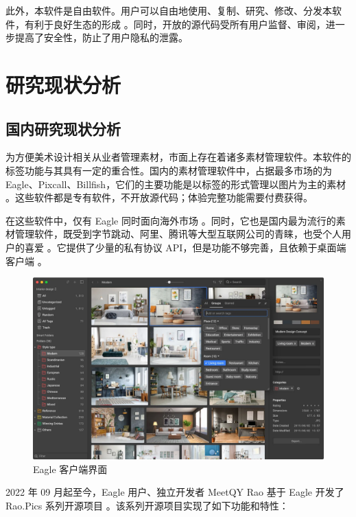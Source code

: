 此外，本软件是自由软件。用户可以自由地使用、复制、研究、修改、分发本软件，有利于良好生态的形成 \cite{free}。同时，开放的源代码受所有用户监督、审阅，进一步提高了安全性，防止了用户隐私的泄露。

\section{研究现状分析}

\subsection{国内研究现状分析}

为方便美术设计相关从业者管理素材，市面上存在着诸多素材管理软件。本软件的标签功能与其具有一定的重合性。国内的素材管理软件中，占据最多市场的为 Eagle、Pixcall、Billfish，它们的主要功能是以标签的形式管理以图片为主的素材 \cite{eagle} \cite{pixcall} \cite{billfish}。这些软件都是专有软件，不开放源代码；体验完整功能需要付费获得。

在这些软件中，仅有 Eagle 同时面向海外市场 \cite{eagle_line}。同时，它也是国内最为流行的素材管理软件，既受到字节跳动、阿里、腾讯等大型互联网公司的青睐，也受个人用户的喜爱 \cite{eagle_count}。它提供了少量的私有协议 API，但是功能不够完善，且依赖于桌面端客户端 \cite{eagle_api}。

\begin{figure}[h]
    \centering
    \includegraphics[width=\textwidth]{figures/eagle.png}
    \caption{Eagle 客户端界面}
    \label{fig:eagle}
\end{figure}

2022 年 09 月起至今，Eagle 用户、独立开发者 MeetQY Rao 基于 Eagle 开发了 Rao.Pics 系列开源项目 \cite{rao}。该系列开源项目实现了如下功能和特性：

